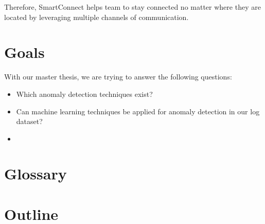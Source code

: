 Therefore, SmartConnect helps team to stay connected no matter where they are located by leveraging multiple channels of communication. 



\section{Goals}
With our master thesis, we are trying to answer the following questions: 
\begin{itemize}
    \item Which anomaly detection techniques exist?
    \item Can machine learning techniques be applied for anomaly detection in our log dataset?
    \item 
\end{itemize}
\section{Glossary}

\section{Outline}
